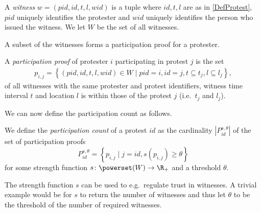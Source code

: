 \begin{frame}
\begin{definition}[Witness]
  A \emph{witness} \(w = (pid, id, t, l, wid)\) is a tuple where
  \(id, t, l\) are as in \cref{DefProtest},
  \(pid\) uniquely identifies the protester and \(wid\) uniquely identifies the 
  person who issued the witness.
  We let \(W\) be the set of all witnesses.
\end{definition}
\end{frame}

A subset of the witnesses forms a participation proof for a protester.

\begin{frame}
\begin{definition}
  A \emph{participation proof} of protester \(i\) participating in protest \(j\) 
  is the set
  \begin{align}
    \nonumber
    p_{i, j} =
    \left\{ (pid, id, t, l, wid)\in W \mid
    pid = i, id = j,
    t \subseteq t_j, l\subseteq l_j \right\},
  \end{align}
  of all witnesses with the same protester and protest identifiers, witness time 
  interval \(t\) and location \(l\) is within those of the protest \(j\) (i.e.\ 
  \(t_j\) and \(l_j\)).
\end{definition}
\end{frame}

We can now define the participation count as follows.
\begin{definition}
  We define the \emph{participation count} of a protest \(id\) as the 
  cardinality \(|P_{id}^{s,\theta}|\) of the set of participation proofs \[
    P_{id}^{s,\theta} = \left\{ p_{i,j} \mid
      j = id, s(p_{i,j})\geq \theta \right\}
  \] for some strength function \(s\colon \powerset(W)\to \R_+\) and a threshold 
  \(\theta\).
\end{definition}

The strength function \(s\) can be used to e.g.\ regulate trust in witnesses.
A trivial example would be for \(s\) to return the number of witnesses and thus 
let \(\theta\) to be the threshold of the number of required witnesses.
